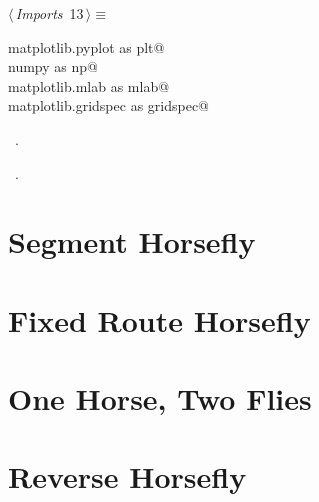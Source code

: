 \documentclass[12pt]{report}
\begin{document}
\begin{flushleft} \small
\begin{minipage}{\linewidth}\label{scrap4}\raggedright\small
{} $\langle\,${\itshape Imports}\nobreak\ {\footnotesize {13}}$\,\rangle\equiv$
\vspace{-1ex}
\begin{list}{}{} \item
\mbox{}\verb@import matplotlib.pyplot as plt@\\
\mbox{}\verb@import numpy as np@\\
\mbox{}\verb@import matplotlib.mlab as mlab@\\
\mbox{}\verb@import matplotlib.gridspec as gridspec@\\
\mbox{}\verb@@{\NWsep}
\end{list}
\vspace{-1.5ex}
\footnotesize
\begin{list}{}{\setlength{\itemsep}{-\parsep}\setlength{\itemindent}{-\leftmargin}}
\item \NWtxtMacroDefBy\ .
\item \NWtxtMacroRefIn\ .

\item{}
\end{list}
\end{minipage}\vspace{4ex}
\end{flushleft}
\newchunk \blindtext
\newchunk \blindtext
\chapter{Segment Horsefly}\chapter{Fixed Route Horsefly}
\chapter{One Horse, Two Flies}
\chapter{Reverse Horsefly}
\end{document}
